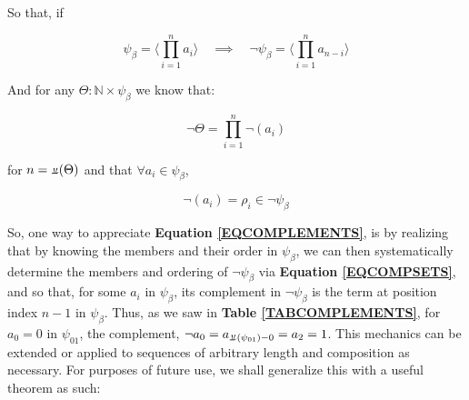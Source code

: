 \documentclass[a4paper, 18pt]{book} %
\newcommand{\invpi}{\rotatebox[origin=c]{180}{$\pi$}}
\begin{document}
So that, if

\begin{equation}
\label{EQCOMPSETS}
\psi_\beta = \langle \prod\limits_{i=1}^{n} a_i \rangle \quad \implies \quad \lnot\psi_\beta = \langle \prod\limits_{i=1}^{n} a_{n-i} \rangle
\end{equation}

And for any $\Theta: \mathbb{N} \times \psi_\beta$ we know that:

\begin{equation}
\lnot\Theta = \prod\limits_{i=1}^{n} \lnot(a_i)
\end{equation}

for $n = \invpi(\Theta)$ and that $\forall a_i \in \psi_\beta$, 

\begin{equation}
\label{EQCOMPLEMENTS}
\lnot(a_i) = \rho_i \in \lnot\psi_\beta
\end{equation}


So, one way to appreciate \textbf{Equation \ref{EQCOMPLEMENTS}}, is by realizing that by knowing the members and their order in $\psi_\beta$, we can then systematically determine the members and ordering of $\lnot\psi_\beta$ via \textbf{Equation \ref{EQCOMPSETS}}, and so that, for some $a_i$ in $\psi_\beta$, its complement in $\lnot\psi_\beta$ is the term at position index $n-1$ in $\psi_\beta$. Thus, as we saw in \textbf{Table \ref{TABCOMPLEMENTS}}, for $a_0 = 0$ in $\psi_{01}$, the complement, $\lnot a_0 = a_{\invpi(\psi_{01})-0} = a_2 = 1$. This mechanics can be extended or applied to sequences of arbitrary length and composition as necessary. For purposes of future use, we shall generalize this with a useful theorem as such:


\end{document}
